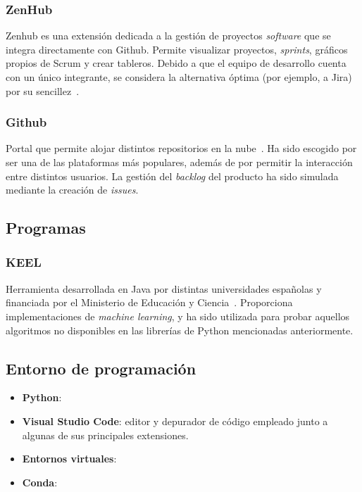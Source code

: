 \subsubsection{ZenHub}

Zenhub es una extensión dedicada a la gestión de proyectos \textit{software} que se integra directamente con Github. Permite visualizar proyectos, \textit{sprints}, gráficos propios de Scrum y crear tableros. Debido a que el equipo de desarrollo cuenta con un único integrante, se considera la alternativa óptima (por ejemplo, a Jira) por su sencillez~\cite{zenhubHome}.

\subsubsection{Github}

Portal que permite alojar distintos repositorios en la nube~\cite{githubHome}. Ha sido escogido por ser una de las plataformas más populares, además de por permitir la interacción entre distintos usuarios. La gestión del \textit{backlog} del producto ha sido simulada mediante la creación de \textit{issues}.


\subsection{Programas}

\subsubsection{KEEL}

Herramienta desarrollada en Java por distintas universidades españolas y financiada por el Ministerio de Educación y Ciencia~\cite{keelRepo}. Proporciona implementaciones de \textit{machine learning}, y ha sido utilizada para probar aquellos algoritmos no disponibles en las librerías de Python mencionadas anteriormente.

\subsection{Entorno de programación}

\begin{itemize}
	\item \textbf{Python}:
	\item \textbf{Visual Studio Code}: editor y depurador de código empleado junto a algunas de sus principales extensiones.
	\item \textbf{Entornos virtuales}: 
	\item \textbf{Conda}:
\end{itemize}

